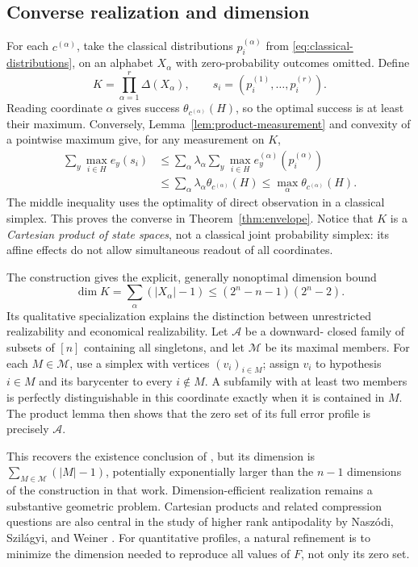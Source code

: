 \documentclass[a4paper,11pt,onecolumn,unpublished]{quantumarticle}
\theoremstyle{definition}
\newcommand{\1}{\mathbf 1}
\begin{document}
\subsection{Converse realization and dimension}

For each $c^{(\alpha)}$, take the classical distributions
$p_i^{(\alpha)}$ from \eqref{eq:classical-distributions}, on an alphabet
$X_\alpha$ with zero-probability outcomes omitted. Define
\begin{equation}\label{eq:product-realization}
 K=\prod_{\alpha=1}^r\Delta(X_\alpha),\qquad
 s_i=(p_i^{(1)},\ldots,p_i^{(r)}).
\end{equation}
Reading coordinate $\alpha$ gives success $\theta_{c^{(\alpha)}}(H)$, so the
optimal success is at least their maximum. Conversely,
Lemma~\ref{lem:product-measurement} and convexity of a pointwise maximum give,
for any measurement on $K$,
\begin{align*}
 \sum_y\max_{i\in H}e_y(s_i)
 &\le\sum_\alpha\lambda_\alpha
       \sum_y\max_{i\in H}e_y^{(\alpha)}(p_i^{(\alpha)})\\
 &\le\sum_\alpha\lambda_\alpha\theta_{c^{(\alpha)}}(H)
 \le\max_\alpha\theta_{c^{(\alpha)}}(H).
\end{align*}
The middle inequality uses the optimality of direct observation in a classical
simplex. This proves the converse in Theorem~\ref{thm:envelope}. Notice that
$K$ is a \emph{Cartesian product of state spaces}, not a classical joint
probability simplex: its affine effects do not allow simultaneous readout of
all coordinates.

The construction gives the explicit, generally nonoptimal dimension bound
\begin{equation}\label{eq:dimension-bound}
 \dim K=\sum_\alpha(|X_\alpha|-1)
 \le(2^n-n-1)(2^n-2).
\end{equation}
Its qualitative specialization explains the distinction between unrestricted
realizability and economical realizability. Let $\mathcal A$ be a downward-
closed family of subsets of $[n]$ containing all singletons, and let
$\mathcal M$ be its maximal members. For each $M\in\mathcal M$, use a simplex
with vertices $(v_i)_{i\in M}$; assign $v_i$ to hypothesis $i\in M$ and its
barycenter to every $i\notin M$. A subfamily with at least two members is
perfectly distinguishable in this coordinate exactly when it is contained in
$M$. The product lemma then shows that the zero set of its full error profile
is precisely $\mathcal A$.

This recovers the existence conclusion of \cite{Weiner2025}, but its dimension
is $\sum_{M\in\mathcal M}(|M|-1)$, potentially exponentially larger than the
$n-1$ dimensions of the construction in that work. Dimension-efficient
realization remains a substantive geometric problem. Cartesian products and
related compression questions are also central in the study of higher rank
antipodality by Nasz\'odi, Szil\'agyi, and Weiner
\cite{NaszodiSzilagyiWeiner2025}. For quantitative profiles, a natural refinement
is to minimize the dimension needed to reproduce all values of $F$, not only
its zero set.
\end{document}

